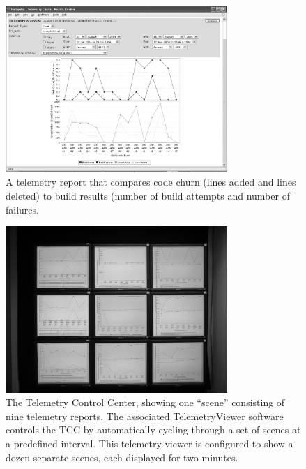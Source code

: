 \documentclass[11pt,twocolumn]{article}
\begin{document}
\begin{figure}[h]
  \centering
  \includegraphics[width=0.75\textwidth]{BuildAndChurn.eps}
  \caption{A telemetry report that compares code churn (lines
  added and lines deleted) to build results (number of build attempts and
  number of failures.} 
  \label{fig:telemetryreport}
\end{figure}

\begin{figure}[h]
  \centering
  \includegraphics[width=0.75\textwidth]{Wall.eps}

  \caption{The Telemetry Control Center, showing one ``scene'' consisting
  of nine telemetry reports. The associated TelemetryViewer software 
  controls the TCC by automatically cycling
  through a set of scenes at a predefined interval. This 
  telemetry viewer is configured to show a dozen separate
  scenes, each displayed for two minutes.  }
  \label{fig:telemetrycontrolcenter}
\end{figure}




\end{document}
